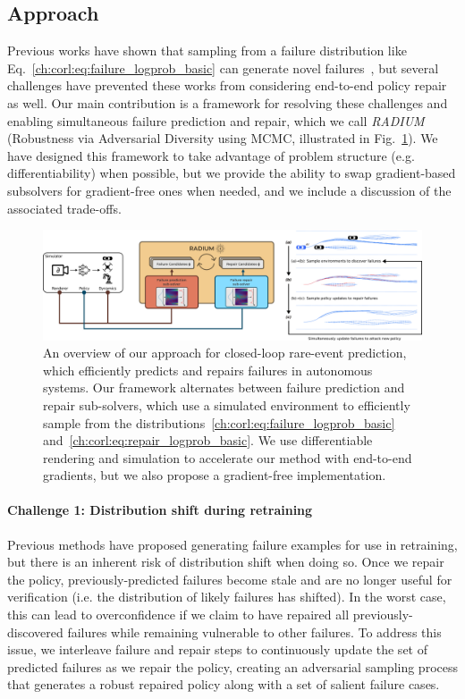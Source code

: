 {\subsection{Approach}

Previous works have shown that sampling from a failure distribution like Eq.~\eqref{ch:corl:eq:failure_logprob_basic} can generate novel failures~\cite{zhouRoCUSRobotController2021,sinhaNeuralBridgeSampling2020,deleckiModelbasedValidationProbabilistic2023a}, but several challenges have prevented these works from considering end-to-end policy repair as well. Our main contribution is a framework for resolving these challenges and enabling simultaneous failure prediction and repair, which we call \textit{RADIUM} (Robustness via Adversarial Diversity using MCMC, illustrated in Fig.~\ref{ch:corl:fig:architecture}). We have designed this framework to take advantage of problem structure (e.g. differentiability) when possible, but we provide the ability to swap gradient-based subsolvers for gradient-free ones when needed, and we include a discussion of the associated trade-offs.

\begin{figure}[tb]
    \centering
    \includegraphics[width=\linewidth]{images/corl/architecture.png}
    \caption{An overview of our approach for closed-loop rare-event prediction, which efficiently predicts and repairs failures in autonomous systems. Our framework alternates between failure prediction and repair sub-solvers, which use a simulated environment to efficiently sample from the distributions~\eqref{ch:corl:eq:failure_logprob_basic} and~\eqref{ch:corl:eq:repair_logprob_basic}. We use differentiable rendering and simulation to accelerate our method with end-to-end gradients, but we also propose a gradient-free implementation.}\label{ch:corl:fig:architecture}
\end{figure}

\paragraph{Challenge 1: Distribution shift during retraining} Previous methods have proposed generating failure examples for use in retraining, but there is an inherent risk of distribution shift when doing so. Once we repair the policy, previously-predicted failures become stale and are no longer useful for verification (i.e. the distribution of likely failures has shifted). In the worst case, this can lead to overconfidence if we claim to have repaired all previously-discovered failures while remaining vulnerable to other failures. To address this issue, we interleave failure and repair steps to continuously update the set of predicted failures as we repair the policy, creating an adversarial sampling process that generates a robust repaired policy along with a set of salient failure cases.

}
